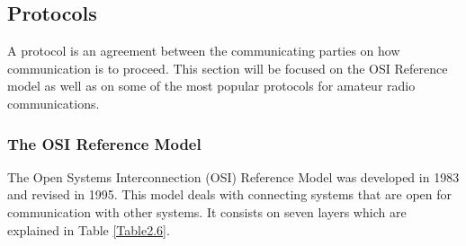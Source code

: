 \subsection{Protocols}
A protocol is an agreement between the communicating parties on how communication is to proceed\cite{Tanenbaum}. This section will be focused on the OSI Reference model as well as on some of the most popular protocols for amateur radio communications.

\subsubsection{The OSI Reference Model}
The Open Systems Interconnection (OSI) Reference Model was developed in 1983 and revised in 1995. This model deals with connecting systems that are open for communication with other systems. It consists on seven layers which are explained in Table \ref{Table2.6}.\\

